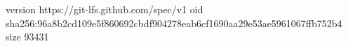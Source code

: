 version https://git-lfs.github.com/spec/v1
oid sha256:96a8b2cd109e5f860692cbdf904278eab6cf1690aa29e53ae5961067ffb752b4
size 93431

